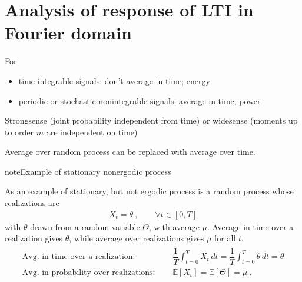 \documentclass[letterpaper,10pt,english]{jupyterBook}
\begin{document}
\section{Analysis of response of LTI in Fourier domain}
\label{\detokenize{ch/system-theory/lti-response:analysis-of-response-of-lti-in-fourier-domain}}
\sphinxAtStartPar
{} For
\begin{itemize}
\item {} 
\sphinxAtStartPar
time integrable signals: don’t average in time; energy

\item {} 
\sphinxAtStartPar
periodic or stochastic non\sphinxhyphen{}integrable signals: average in time; power

\end{itemize}

\sphinxAtStartPar
{} Strong\sphinxhyphen{}sense (joint probability independent from time) or wide\sphinxhyphen{}sense (moments up to order \(m\) are independent on time)

\sphinxAtStartPar
{} Average over random process can be replaced with average over time.

\begin{sphinxadmonition}{note}{Example of stationary non\sphinxhyphen{}ergodic process}

\sphinxAtStartPar
As an example of stationary, but not ergodic process is a random process whose realizations are
\begin{equation*}
\begin{split}X_t = \theta \ , \qquad \forall t \in [0,T]\end{split}
\end{equation*}
\sphinxAtStartPar
with \(\theta\) drawn from a random variable \(\Theta\), with average \(\mu\). Average in time over a realization gives \(\theta\), while average over realizations gives \(\mu\) for all \(t\),
\begin{equation*}
\begin{split}\begin{aligned}
  \text{Avg. in time over a realization:       } & \quad  \dfrac{1}{T} \int_{t=0}^{T} X_t \, dt = \dfrac{1}{T} \int_{t=0}^{T} \theta \, dt = \theta \\
  \text{Avg. in probability over realizations: } & \quad  \mathbb{E}[X_t] = \mathbb{E}[\Theta] = \mu \ .
\end{aligned}\end{split}
\end{equation*}\end{sphinxadmonition}
\end{document}
